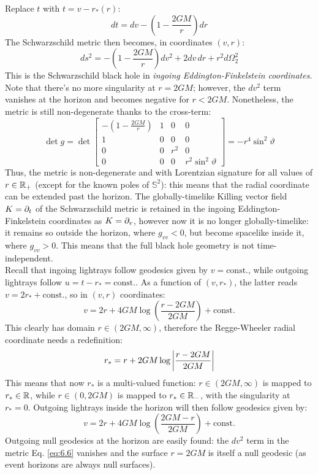 Replace $ t $ with $ t = v - r_*(r) $:
\begin{equation*}
  dt = dv - \left( 1 - \frac{2GM}{r} \right) dr
\end{equation*}
The Schwarzschild metric then becomes, in coordinates $ (v,r) $:
\begin{equation}
  ds^2 = - \left( 1 - \frac{2GM}{r} \right) dv^2 + 2 dv\,dr + r^2 d\Omega_2^2
  \label{eq:6.6}
\end{equation}
This is the Schwarzschild black hole in \textit{ingoing Eddington-Finkelstein coordinates}. Note that there's no more singularity at $ r = 2GM $; however, the $ dv^2 $ term vanishes at the horizon and becomes negative for $ r < 2GM $. Nonetheless, the metric is still non-degenerate thanks to the cross-term:
\begin{equation*}
  \det g = \det
  \begin{bmatrix}
    - (1 - \frac{2GM}{r}) & 1 & 0 & 0 \\
    1 & 0 & 0 & 0 \\
    0 & 0 & r^2 & 0 \\
    0 & 0 & 0 & r^2 \sin^2 \vartheta
  \end{bmatrix}
  = - r^4 \sin^2 \vartheta
\end{equation*}
Thus, the metric is non-degenerate and with Lorentzian signature for all values of $ r \in \mathbb{R}_+ $ (except for the known poles of $ \mathbb{S}^2 $): this means that the radial coordinate can be extended past the horizon. The globally-timelike Killing vector field $ K = \partial_t $ of the Schwarzschild metric is retained in the ingoing Eddington-Finkelstein coordinates as $ K = \partial_v $, however now it is no longer globally-timelike: it remains so outside the horizon, where $ g_{vv} < 0 $, but become spacelike inside it, where $ g_{vv} > 0 $. This means that the full black hole geometry is not time-independent.\\
Recall that ingoing lightrays follow geodesics given by $ v = \text{const.} $, while outgoing lightrays follow $ u = t - r_* = \text{const.} $. As a function of $ (v,r_*) $, the latter reads $ v = 2r_* + \text{const.} $, so in $ (v,r) $ coordinates:
\begin{equation*}
  v =  2r + 4GM \log \left( \frac{r - 2GM}{2GM} \right) + \text{const.}
\end{equation*}
This clearly has domain $ r \in (2GM, \infty) $, therefore the Regge-Wheeler radial coordinate needs a redefinition:
\begin{equation*}
  r_* = r + 2GM \log \left\lvert\frac{r - 2GM}{2GM}\right\rvert
\end{equation*}
This means that now $ r_* $ is a multi-valued function: $ r \in (2GM, \infty) $ is mapped to $ r_* \in \mathbb{R} $, while $ r \in (0, 2GM) $ is mapped to $ r_* \in \mathbb{R}_- $, with the singularity at $ r_* = 0 $. Outgoing lightrays inside the horizon will then follow geodesics given by:
\begin{equation*}
  v = 2r + 4GM \log \left( \frac{2GM - r}{2GM} \right) + \text{const.}
\end{equation*}
Outgoing null geodesics at the horizon are easily found: the $ dv^2 $ term in the metric Eq. \ref{eq:6.6} vanishes and the surface $ r = 2GM $ is itself a null geodesic (as event horizons are always null surfaces).

